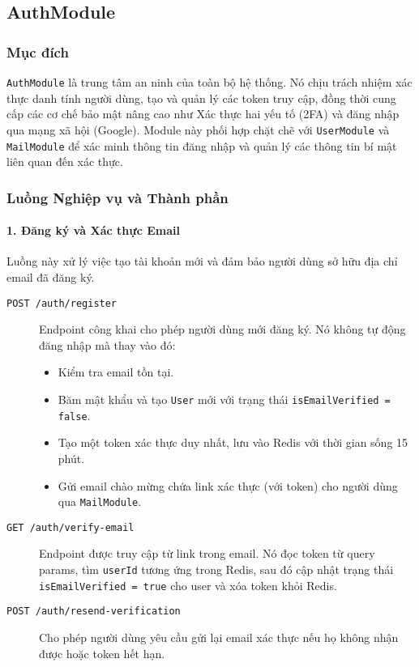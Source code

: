 \subsection{AuthModule}
\label{subsec:auth-module}

\subsubsection{Mục đích}
\texttt{AuthModule} là trung tâm an ninh của toàn bộ hệ thống. Nó chịu trách nhiệm xác thực danh tính người dùng, tạo và quản lý các token truy cập, đồng thời cung cấp các cơ chế bảo mật nâng cao như Xác thực hai yếu tố (2FA) và đăng nhập qua mạng xã hội (Google). Module này phối hợp chặt chẽ với \texttt{UserModule} và \texttt{MailModule} để xác minh thông tin đăng nhập và quản lý các thông tin bí mật liên quan đến xác thực.

\subsubsection{Luồng Nghiệp vụ và Thành phần}

\paragraph{1. Đăng ký và Xác thực Email}
Luồng này xử lý việc tạo tài khoản mới và đảm bảo người dùng sở hữu địa chỉ email đã đăng ký.
\begin{description}
    \item[\texttt{POST /auth/register}] Endpoint công khai cho phép người dùng mới đăng ký. Nó không tự động đăng nhập mà thay vào đó:
    \begin{itemize}
        \item Kiểm tra email tồn tại.
        \item Băm mật khẩu và tạo \texttt{User} mới với trạng thái \texttt{isEmailVerified = false}.
        \item Tạo một token xác thực duy nhất, lưu vào Redis với thời gian sống 15 phút.
        \item Gửi email chào mừng chứa link xác thực (với token) cho người dùng qua \texttt{MailModule}.
    \end{itemize}
    \item[\texttt{GET /auth/verify-email}] Endpoint được truy cập từ link trong email. Nó đọc token từ query params, tìm \texttt{userId} tương ứng trong Redis, sau đó cập nhật trạng thái \texttt{isEmailVerified = true} cho user và xóa token khỏi Redis.
    \item[\texttt{POST /auth/resend-verification}] Cho phép người dùng yêu cầu gửi lại email xác thực nếu họ không nhận được hoặc token hết hạn.
\end{description}

